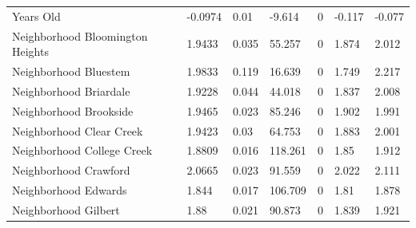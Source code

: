 \documentclass{article}
\begin{document}
\begin{table}[]
\begin{tabular}{lllllll}
		Years Old                        & -0.0974                   & 0.01                         & -9.614                 & 0                                       & -0.117                        & -0.077                        \\
		Neighborhood Bloomington Heights & 1.9433                    & 0.035                        & 55.257                 & 0                                       & 1.874                         & 2.012                         \\
		Neighborhood Bluestem            & 1.9833                    & 0.119                        & 16.639                 & 0                                       & 1.749                         & 2.217                         \\
		Neighborhood Briardale           & 1.9228                    & 0.044                        & 44.018                 & 0                                       & 1.837                         & 2.008                         \\
		Neighborhood Brookside           & 1.9465                    & 0.023                        & 85.246                 & 0                                       & 1.902                         & 1.991                         \\
		Neighborhood Clear Creek         & 1.9423                    & 0.03                         & 64.753                 & 0                                       & 1.883                         & 2.001                         \\
		Neighborhood College Creek       & 1.8809                    & 0.016                        & 118.261                & 0                                       & 1.85                          & 1.912                         \\
		Neighborhood Crawford            & 2.0665                    & 0.023                        & 91.559                 & 0                                       & 2.022                         & 2.111                         \\
		Neighborhood Edwards             & 1.844                     & 0.017                        & 106.709                & 0                                       & 1.81                          & 1.878                         \\
		Neighborhood Gilbert             & 1.88                      & 0.021                        & 90.873                 & 0                                       & 1.839                         & 1.921                         \\

\end{tabular}
\end{table}
\end{document}
